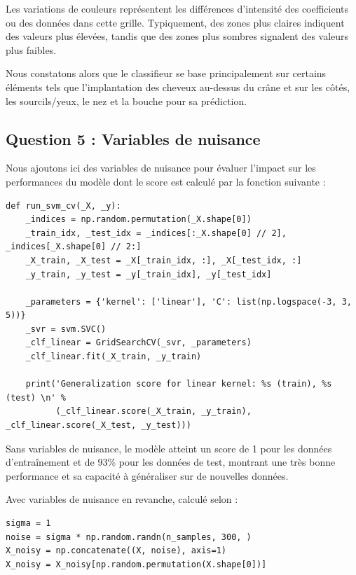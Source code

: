 \documentclass{article}
\begin{document}
\hspace{7pt} Les variations de couleurs représentent les différences d'intensité des coefficients ou des données dans cette grille. Typiquement, des zones plus claires indiquent des valeurs plus élevées, tandis que des zones plus sombres signalent des valeurs plus faibles.\newline

\hspace{7pt} Nous constatons alors que le classifieur se base principalement sur certains éléments tels que l'implantation des cheveux au-dessus du crâne et sur les côtés, les sourcils/yeux, le nez et la bouche pour sa prédiction.

\subsection{Question 5 : Variables de nuisance}
\hspace{7pt} Nous ajoutons ici des variables de nuisance pour évaluer l'impact sur les performances du modèle dont le score est calculé par la fonction suivante :\newline
\begin{lstlisting}
def run_svm_cv(_X, _y):
    _indices = np.random.permutation(_X.shape[0])
    _train_idx, _test_idx = _indices[:_X.shape[0] // 2], _indices[_X.shape[0] // 2:]
    _X_train, _X_test = _X[_train_idx, :], _X[_test_idx, :]
    _y_train, _y_test = _y[_train_idx], _y[_test_idx]

    _parameters = {'kernel': ['linear'], 'C': list(np.logspace(-3, 3, 5))}
    _svr = svm.SVC()
    _clf_linear = GridSearchCV(_svr, _parameters)
    _clf_linear.fit(_X_train, _y_train)

    print('Generalization score for linear kernel: %s (train), %s (test) \n' %
          (_clf_linear.score(_X_train, _y_train), _clf_linear.score(_X_test, _y_test)))
\end{lstlisting}

\hspace{7pt} Sans variables de nuisance, le modèle atteint un score de 1 pour les données d'entraînement et de 93\% pour les données de test, montrant une très bonne performance et sa capacité à généraliser sur de nouvelles données.\newline

\hspace{7pt} Avec variables de nuisance en revanche, calculé selon :

\begin{lstlisting}
sigma = 1
noise = sigma * np.random.randn(n_samples, 300, )
X_noisy = np.concatenate((X, noise), axis=1)
X_noisy = X_noisy[np.random.permutation(X.shape[0])]
\end{lstlisting}
\end{document}
